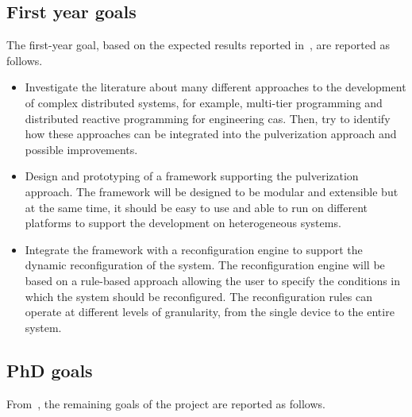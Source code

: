 \documentclass[12pt]{article}
\begin{document}
\subsection{First year goals}\label{subsec:first-year-activities}

The first-year goal,
based on the expected results reported in~,
are reported as follows.

\begin{itemize}
	\item Investigate the literature about many different approaches to the development of complex distributed systems,
		for example, multi-tier programming and distributed reactive programming for engineering \ac{cas}.
		Then, try to identify how these approaches can be integrated into the pulverization approach and possible improvements.
	\item Design and prototyping of a framework supporting the pulverization approach.
		The framework will be designed to be modular and extensible but at the same time,
		it should be easy to use and able to run on different platforms to support the development on heterogeneous systems.
	\item Integrate the framework with a reconfiguration engine to support the dynamic reconfiguration of the system.
		The reconfiguration engine will be based on a rule-based approach allowing the user to specify the conditions in which the system should be reconfigured.
		The reconfiguration rules can operate at different levels of granularity,
		from the single device to the entire system.
\end{itemize}

\subsection{PhD goals}\label{subsec:phd-activities}

From~,
the remaining goals of the project are reported as follows.
\end{document}
